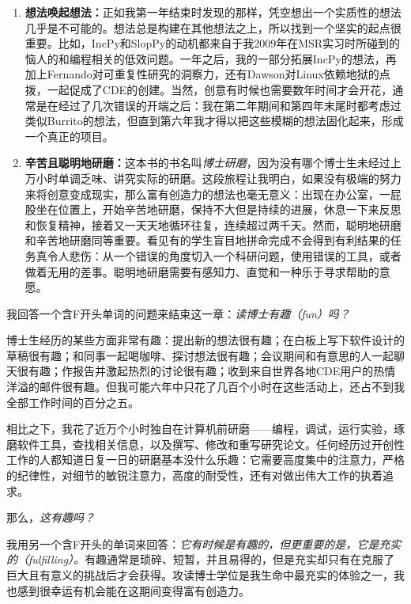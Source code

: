 \documentclass[letter,12pt]{book}
\newcommand{\bookname}{博士研磨}
\begin{document}
\begin{CJK}{UTF8}{gbsn}
\begin{enumerate}
  \item \textbf{想法唤起想法：}正如我第一年结束时发现的那样，凭空想出一个实质性的想法几乎是不可能的。想法总是构建在其他想法之上，所以找到一个坚实的起点很重要。比如，IncPy和SlopPy的动机都来自于我2009年在MSR实习时所碰到的恼人的和编程相关的低效问题。一年之后，我的一部分拓展IncPy的想法，再加上Fernando对可重复性研究的洞察力，还有Dawson对Linux依赖地狱的点拨，一起促成了CDE的创建。当然，创意有时候也需要数年时间才会开花，通常是在经过了几次错误的开端之后：我在第二年期间和第四年末尾时都考虑过类似Burrito的想法，但直到第六年我才得以把这些模糊的想法固化起来，形成一个真正的项目。
  \item \textbf{辛苦且聪明地研磨：}这本书的书名叫\emph{\bookname}，因为没有哪个博士生未经过上万小时单调乏味、讲究实际的研磨。这段旅程让我明白，如果没有极端的努力来将创意变成现实，那么富有创造力的想法也毫无意义：出现在办公室，一屁股坐在位置上，开始辛苦地研磨，保持不大但是持续的进展，休息一下来反思和恢复精神，接着又一天天地循环往复，连续超过两千天。然而，聪明地研磨和辛苦地研磨同等重要。看见有的学生盲目地拼命完成不会得到有利结果的任务真令人悲伤：从一个错误的角度切入一个科研问题，使用错误的工具，或者做着无用的差事。聪明地研磨需要有感知力、直觉和一种乐于寻求帮助的意愿。
\end{enumerate}

\breakline

我回答一个含F开头单词的问题来结束这一章：\emph{读博士有趣（fun）吗？}

博士生经历的某些方面非常有趣：提出新的想法很有趣；在白板上写下软件设计的草稿很有趣；和同事一起喝咖啡、探讨想法很有趣；会议期间和有意思的人一起聊天很有趣；作报告并激起热烈的讨论很有趣；收到来自世界各地CDE用户的热情洋溢的邮件很有趣。但我可能六年中只花了几百个小时在这些活动上，还占不到我全部工作时间的百分之五。

相比之下，我花了近万个小时独自在计算机前研磨——编程，调试，运行实验，琢磨软件工具，查找相关信息，以及撰写、修改和重写研究论文。任何经历过开创性工作的人都知道日复一日的研磨基本没什么乐趣：它需要高度集中的注意力，严格的纪律性，对细节的敏锐注意力，高度的耐受性，还有对做出伟大工作的执着追求。

那么，\emph{这有趣吗？}

我用另一个含F开头的单词来回答：\emph{它有时候是有趣的，但更重要的是，它是充实的（fulfilling）。}有趣通常是琐碎、短暂，并且易得的，但是充实却只有在克服了巨大且有意义的挑战后才会获得。攻读博士学位是我生命中最充实的体验之一，我也感到很幸运有机会能在这期间变得富有创造力。


\end{CJK}
\end{document}
